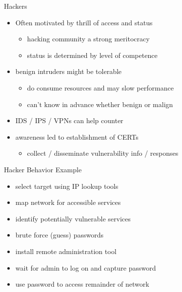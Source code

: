 \documentclass{beamer}
\begin{document}
\begin{frame}{Hackers}
  \begin{itemize}
  \item Often motivated by thrill of access and status 
    \begin{itemize}
    \item hacking community a strong meritocracy 
    \item status is determined by level of competence 
    \end{itemize}
  \item benign intruders might be tolerable 
    \begin{itemize}
    \item do consume resources and may slow performance 
    \item can't know in advance whether benign or malign 
    \end{itemize}
  \item IDS / IPS / VPNs can help counter 
  \item awareness led to establishment of CERTs 
    \begin{itemize}
    \item collect / disseminate vulnerability info / responses 
    \end{itemize}
  \end{itemize}
\end{frame}

\begin{frame}{Hacker Behavior Example}
  \begin{itemize}
  \item select target using IP lookup tools 
  \item map network for accessible services 
  \item identify potentially vulnerable services 
  \item brute force (guess) passwords
  \item install remote administration tool 
  \item wait for admin to log on and capture password
  \item use password to access remainder of network
  \end{itemize}
\end{frame}
\end{document}
